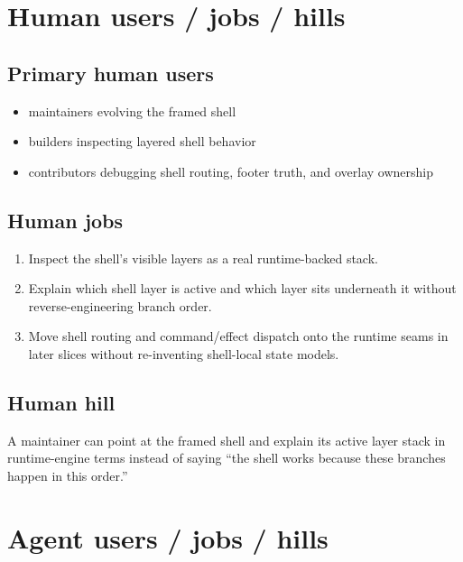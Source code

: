 \section{Human users / jobs / hills}\label{record-155-human-users-jobs-hills}

\subsection{Primary human users}\label{record-155-primary-human-users}

\begin{itemize}
\tightlist
\item
  maintainers evolving the framed shell
\item
  builders inspecting layered shell behavior
\item
  contributors debugging shell routing, footer truth, and overlay ownership
\end{itemize}

\subsection{Human jobs}\label{record-155-human-jobs}

\begin{enumerate}
\def\labelenumi{\arabic{enumi}.}
\tightlist
\item
  Inspect the shell's visible layers as a real runtime-backed stack.
\item
  Explain which shell layer is active and which layer sits underneath it without reverse-engineering branch order.
\item
  Move shell routing and command/effect dispatch onto the runtime seams in later slices without re-inventing shell-local state models.
\end{enumerate}

\subsection{Human hill}\label{record-155-human-hill}

A maintainer can point at the framed shell and explain its active layer stack in runtime-engine terms instead of saying ``the shell works because these branches happen in this order.''

\section{Agent users / jobs / hills}\label{record-155-agent-users-jobs-hills}

